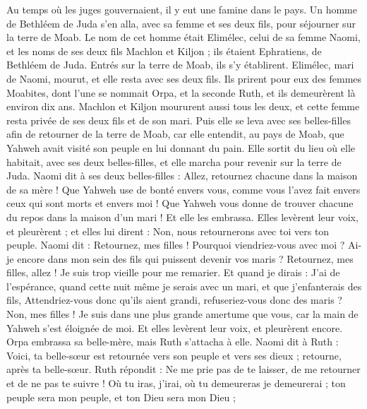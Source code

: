 \begin{multicols}{2}
\VerseOne{}Au temps où les juges gouvernaient, il y eut une famine dans le pays. Un homme de Bethléem de Juda s'en alla, avec sa femme et ses deux fils, pour séjourner sur la terre de Moab.
Le nom de cet homme était Elimélec, celui de sa femme Naomi, et les noms de ses deux fils Machlon et Kiljon ; ils étaient Ephratiens, de Bethléem de Juda. Entrés sur la terre de Moab, ils s’y établirent.
Elimélec, mari de Naomi, mourut, et elle resta avec ses deux fils.
Ils prirent pour eux des femmes Moabites, dont l'une se nommait Orpa, et la seconde Ruth, et ils demeurèrent là environ dix ans.
Machlon et Kiljon moururent aussi tous les deux, et cette femme resta privée de ses deux fils et de son mari.
Puis elle se leva avec ses belles-filles afin de retourner de la terre de Moab, car elle entendit, au pays de Moab, que Yahweh avait visité son peuple en lui donnant du pain.
Elle sortit du lieu où elle habitait, avec ses deux belles-filles, et elle marcha pour revenir sur la terre de Juda.
Naomi dit à ses deux belles-filles : Allez, retournez chacune dans la maison de sa mère ! Que Yahweh use de bonté envers vous, comme vous l'avez fait envers ceux qui sont morts et envers moi !
Que Yahweh vous donne de trouver chacune du repos dans la maison d'un mari ! Et elle les embrassa. Elles levèrent leur voix, et pleurèrent ;
et elles lui dirent : Non, nous retournerons avec toi vers ton peuple.
Naomi dit : Retournez, mes filles ! Pourquoi viendriez-vous avec moi ? Ai-je encore dans mon sein des fils qui puissent devenir vos maris ?
Retournez, mes filles, allez ! Je suis trop vieille pour me remarier. Et quand je dirais : J'ai de l'espérance, quand cette nuit même je serais avec un mari, et que j'enfanterais des fils,
Attendriez-vous donc qu'ils aient grandi, refuseriez-vous donc des maris ? Non, mes filles ! Je suis dans une plus grande amertume que vous, car la main de Yahweh s'est éloignée de moi.
Et elles levèrent leur voix, et pleurèrent encore. Orpa embrassa sa belle-mère, mais Ruth s’attacha à elle.
Naomi dit à Ruth : Voici, ta belle-sœur est retournée vers son peuple et vers ses dieux ; retourne, après ta belle-sœur.
Ruth répondit : Ne me prie pas de te laisser, de me retourner et de ne pas te suivre ! Où tu iras, j'irai, où tu demeureras je demeurerai ; ton peuple sera mon peuple, et ton Dieu sera mon Dieu ;

\end{multicols}
